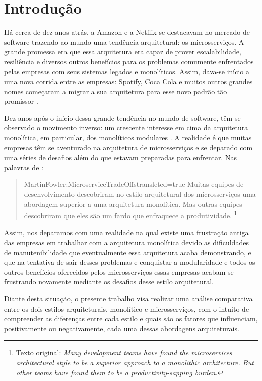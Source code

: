 \chapter[Introdução]{Introdução}

Há cerca de dez anos atrás, a Amazon e a Netflix se destacavam no mercado de software trazendo ao
mundo uma tendência arquitetural: os microsserviços. A grande promessa era que essa
arquitetura era capaz de prover escalabilidade, resiliência e diversos outros benefícios para os
problemas comumente enfrentados pelas empresas com seus sistemas legados e monolíticos. Assim,
dava-se início a uma nova corrida entre as empresas: Spotify, Coca Cola e muitos outros
grandes nomes começaram a migrar a sua arquitetura para esse novo padrão tão promissor
\cite{Aleksandra2019}.

Dez anos após o início dessa grande tendência no mundo de software, têm se observado o movimento
inverso: um crescente interesse em cima da arquitetura monolítica, em particular, dos monolíticos
modulares \cite{QTrends}. A realidade é que muitas empresas têm se aventurado na arquitetura de
microsserviços e se deparado com uma séries de desafios além do que estavam preparadas para
enfrentar. Nas palavras de :

\begin{quotation}{MartinFowler:MicroserviceTradeOffs}{transleted=true}
    Muitas equipes de desenvolvimento descobriram no estilo arquitetural dos microsserviços uma
    abordagem superior a uma arquitetura monolítica. Mas outras equipes descobriram que eles
    são um fardo que enfraquece a produtividade. \footnote{Texto original: \textit{Many
    development teams have found the microservices architectural style to be a superior approach
    to a monolithic architecture. But other teams have found them to be a productivity-sapping
    burden.}}
\end{quotation}

Assim, nos deparamos com uma realidade na qual existe uma frustração antiga das empresas em trabalhar
com a arquitetura monolítica devido as dificuldades de manutenibilidade que eventualmente essa arquitetura
acaba demonstrando, e que na tentativa de sair desses problemas e conquistar a modularidade e todos os outros
benefícios oferecidos pelos microsserviços essas empresas acabam se frustrando novamente mediante os desafios
desse estilo arquitetural.

Diante desta situação, o presente trabalho visa realizar uma análise comparativa entre os dois estilos
arquiteturais, monolítico e microsserviços, com o intuito de compreender as diferenças entre cada estilo
e quais são os fatores que influenciam, positivamente ou negativamente, cada uma dessas abordagens
arquiteturais.

